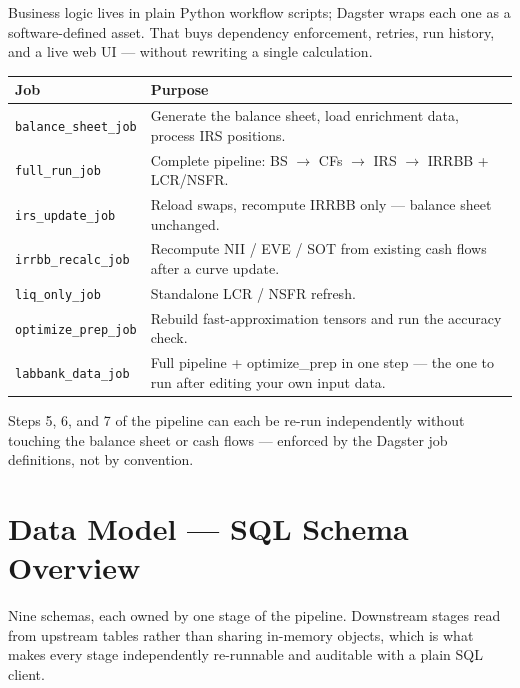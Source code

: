 \documentclass[11pt,a4paper]{article}
\begin{document}
Business logic lives in plain Python workflow scripts; Dagster wraps each one
as a software-defined asset. That buys dependency enforcement, retries, run
history, and a live web UI --- without rewriting a single calculation.

\begin{center}
\small
\begin{tabular}{ll}
\toprule
\textbf{Job} & \textbf{Purpose} \\
\midrule
\texttt{balance\_sheet\_job}  & Generate the balance sheet, load enrichment data, process IRS positions. \\
\texttt{full\_run\_job}       & Complete pipeline: BS $\rightarrow$ CFs $\rightarrow$ IRS $\rightarrow$ IRRBB + LCR/NSFR. \\
\texttt{irs\_update\_job}     & Reload swaps, recompute IRRBB only --- balance sheet unchanged. \\
\texttt{irrbb\_recalc\_job}   & Recompute NII / EVE / SOT from existing cash flows after a curve update. \\
\texttt{liq\_only\_job}       & Standalone LCR / NSFR refresh. \\
\texttt{optimize\_prep\_job}  & Rebuild fast-approximation tensors and run the accuracy check. \\
\texttt{labbank\_data\_job}   & Full pipeline + optimize\_prep in one step --- the one to run after editing your own input data. \\
\bottomrule
\end{tabular}
\end{center}

\begin{pitchbox}
Steps 5, 6, and 7 of the pipeline can each be re-run independently without
touching the balance sheet or cash flows --- enforced by the Dagster job
definitions, not by convention.
\end{pitchbox}

\section{Data Model --- SQL Schema Overview}

Nine schemas, each owned by one stage of the pipeline. Downstream stages read
from upstream tables rather than sharing in-memory objects, which is what makes
every stage independently re-runnable and auditable with a plain SQL client.
\end{document}
